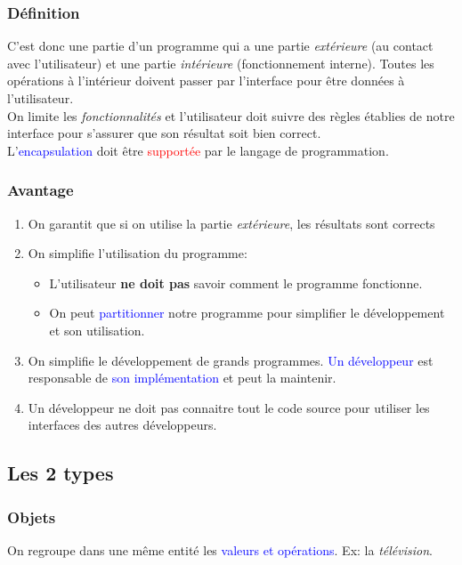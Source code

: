 \documentclass{report}
\begin{document}
\subsubsection{Définition}
C'est donc une partie d'un programme qui a une partie \textit{extérieure} (au contact avec l'utilisateur) et une partie \textit{intérieure} (fonctionnement interne). Toutes les opérations à l'intérieur doivent passer par l'interface pour être données à l'utilisateur.\\
On limite les \textit{fonctionnalités} et l'utilisateur doit suivre des règles établies de notre interface pour s'assurer que son résultat soit bien correct.\\
L'\textcolor{blue}{encapsulation} doit être \textcolor{red}{supportée} par le langage de programmation.

\subsubsection{Avantage}
\begin{enumerate}
\item On garantit que si on utilise la partie \textit{extérieure}, les résultats sont corrects
\item On simplifie l'utilisation du programme:
	\begin{itemize}
	\item L'utilisateur \textbf{ne doit pas} savoir comment le programme fonctionne.
	\item On peut \textcolor{blue}{partitionner} notre programme pour simplifier le développement et son utilisation.
	\end{itemize}
\item On simplifie le développement de grands programmes. \textcolor{blue}{Un développeur} est responsable de \textcolor{blue}{son implémentation} et peut la maintenir.
\item Un développeur ne doit pas connaitre tout le code source pour utiliser les interfaces des autres développeurs.
\end{enumerate}

\subsection{Les 2 types}

\subsubsection{Objets}
On regroupe dans une même entité les \textcolor{blue}{valeurs et opérations}. Ex: la \textit{télévision}.
\end{document}
